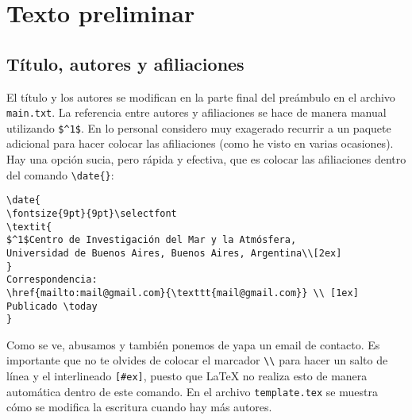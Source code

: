 \documentclass[a4paper,10pt,twocolumn,twoside]{article}
\begin{document}
\section{Texto preliminar}

\subsection{Título, autores y afiliaciones}
El título y los autores se modifican en la parte final del preámbulo en el archivo \texttt{main.txt}. La referencia entre autores y afiliaciones se hace de manera manual utilizando \verb+$^1$+. En lo personal considero muy exagerado recurrir a un paquete adicional para hacer colocar las afiliaciones (como he visto en varias ocasiones). Hay una opción sucia, pero rápida y efectiva, que es colocar las afiliaciones dentro del comando \verb+\date{}+:
\begin{Verbatim}[fontsize=\fontsize{7pt}{7pt}\selectfont]
% Afilaciones, contacto y fecha de publicacion
\date{
\fontsize{9pt}{9pt}\selectfont
\textit{
$^1$Centro de Investigación del Mar y la Atmósfera,
Universidad de Buenos Aires, Buenos Aires, Argentina\\[2ex]
}
Correspondencia: 
\href{mailto:mail@gmail.com}{\texttt{mail@gmail.com}} \\ [1ex]
Publicado \today
}
\end{Verbatim}
Como se ve, abusamos y también ponemos de yapa un email de contacto. Es importante que no te olvides de colocar el marcador \verb+\\+ para hacer un salto de línea y el interlineado \verb+[#ex]+, puesto que \LaTeX{} no realiza esto de manera automática dentro de este comando. En el archivo \texttt{template.tex} se muestra cómo se modifica la escritura cuando hay más autores.
\end{document}
